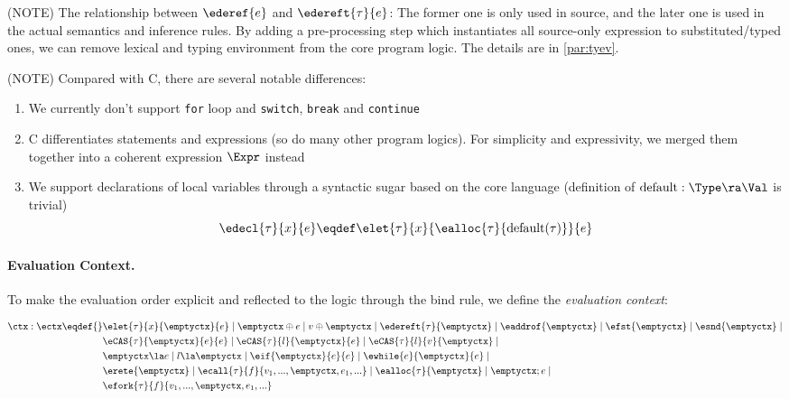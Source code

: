 (NOTE) The relationship between $\ederef{e}$ and $\edereft{\tau}{e}$: The former one is only used in source,
and the later one is used in the actual semantics and inference rules.
By adding a pre-processing step which instantiates all source-only expression to substituted/typed ones,
we can remove lexical and typing environment from the core program logic. The details are in \ref{par:tyev}.

(NOTE) Compared with C, there are several notable differences:
\begin{enumerate}
  \item We currently don't support \texttt{for} loop and \texttt{switch},
    \texttt{break} and \texttt{continue}
  \item C differentiates statements and expressions (so do many other program logics). For simplicity and
    expressivity, we merged them together into a coherent expression $\Expr$ instead
  \item We support declarations of local variables through a syntactic sugar based on the core language
        (definition of $\mathrm{default}: \Type \ra \Val$ is trivial)
        \[ \edecl{\tau}{x}{e} \eqdef \elet{\tau}{x}{\ealloc{\tau}{\mathrm{default}(\tau)}}{e}\]
\end{enumerate}

\paragraph{Evaluation Context.}

To make the evaluation order explicit and reflected to the logic through the bind rule,
we define the \emph{evaluation context}:

\begin{align*}
    \ctx : \ectx \eqdef{}&
        \elet{\tau}{x}{\emptyctx}{e} \mid
        \emptyctx \oplus e \mid
        v \oplus \emptyctx \mid
        \edereft{\tau}{\emptyctx} \mid
        \eaddrof{\emptyctx} \mid
        \efst{\emptyctx} \mid
        \esnd{\emptyctx} \mid
        \\&
        \eCAS{\tau}{\emptyctx}{e}{e} \mid
        \eCAS{\tau}{l}{\emptyctx}{e} \mid
        \eCAS{\tau}{l}{v}{\emptyctx} \mid
        \\&
        \emptyctx \la e \mid
        l \la \emptyctx \mid
        \eif{\emptyctx}{e}{e} \mid
        \ewhile{e}{\emptyctx}{e} \mid
        \\&
        \erete{\emptyctx} \mid
        \ecall{\tau}{f}{v_1, ..., \emptyctx, e_1, ...} \mid
        \ealloc{\tau}{\emptyctx} \mid
        \emptyctx ; e \mid
        \\&
        \efork{\tau}{f}{v_1, ..., \emptyctx, e_1, ...}
\end{align*}

